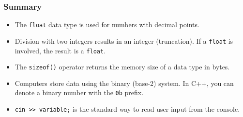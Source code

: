 \documentclass{beamer}
\begin{document}
\begin{frame}
\frametitle{Summary}
\begin{itemize}
    \item The \texttt{float} data type is used for numbers with decimal points.
    \item Division with two integers results in an \alert{integer} (truncation). If a \texttt{float} is involved, the result is a \texttt{float}.
    \item The \texttt{sizeof()} operator returns the memory size of a data type in \alert{bytes}.
    \item Computers store data using the \alert{binary} (base-2) system. In C++, you can denote a binary number with the \texttt{0b} prefix.
    \item \texttt{cin >> variable;} is the standard way to read user input from the console.
\end{itemize}
\end{frame}
\end{document}
